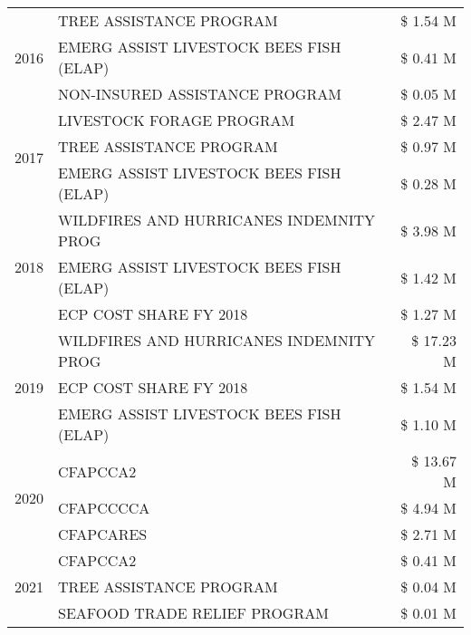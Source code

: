 \begin{tabular}{llr}
\cline{1-3}
\multirow[t]{3}{*}{2016} & TREE ASSISTANCE PROGRAM                       & \$ 1.54 M \\
 & EMERG ASSIST LIVESTOCK BEES FISH (ELAP)       & \$ 0.41 M \\
 & NON-INSURED ASSISTANCE PROGRAM                & \$ 0.05 M \\
\cline{1-3}
\multirow[t]{3}{*}{2017} & LIVESTOCK FORAGE PROGRAM & \$ 2.47 M \\
 & TREE ASSISTANCE PROGRAM & \$ 0.97 M \\
 & EMERG ASSIST LIVESTOCK BEES FISH (ELAP) & \$ 0.28 M \\
\cline{1-3}
\multirow[t]{3}{*}{2018} & WILDFIRES AND HURRICANES INDEMNITY PROG & \$ 3.98 M \\
 & EMERG ASSIST LIVESTOCK BEES FISH (ELAP) & \$ 1.42 M \\
 & ECP COST SHARE FY 2018 & \$ 1.27 M \\
\cline{1-3}
\multirow[t]{3}{*}{2019} & WILDFIRES AND HURRICANES INDEMNITY PROG & \$ 17.23 M \\
 & ECP COST SHARE FY 2018 & \$ 1.54 M \\
 & EMERG ASSIST LIVESTOCK BEES FISH (ELAP) & \$ 1.10 M \\
\cline{1-3}
\multirow[t]{3}{*}{2020} & CFAPCCA2 & \$ 13.67 M \\
 & CFAPCCCCA & \$ 4.94 M \\
 & CFAPCARES & \$ 2.71 M \\
\cline{1-3}
\multirow[t]{3}{*}{2021} & CFAPCCA2 & \$ 0.41 M \\
 & TREE ASSISTANCE PROGRAM & \$ 0.04 M \\
 & SEAFOOD TRADE RELIEF PROGRAM & \$ 0.01 M \\
\cline{1-3}
\bottomrule
\end{tabular}
